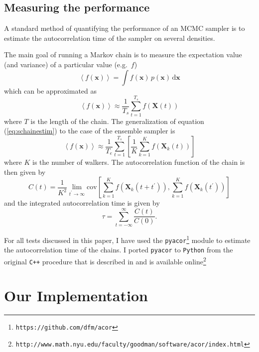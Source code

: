 \documentclass[12pt,preprint]{aastex}
\newcommand{\project}[1]{\texttt{#1}}
\newcommand{\eq}[1]{equation (\ref{eq:#1})}
\newcommand{\eqlabel}[1]{\label{eq:#1}}
\newcommand{\dd}{\mathrm{d}}
\begin{document}
\subsection{Measuring the performance}

A standard method of quantifying the performance of an MCMC sampler is to estimate
the autocorrelation time of the sampler on several densities.

The main goal of running a Markov chain is to measure the expectation value (and
variance) of a particular value (e.g.~$f$)
\begin{equation}
    \left < f(\mathbf{x}) \right > = \int f(\mathbf{x}) \, p (\mathbf{x}) \, \dd \mathbf{x}
\end{equation}
which can be approximated as
\begin{equation}
    \eqlabel{schainestim}
    \left < f(\mathbf{x}) \right > \approx \frac{1}{T_s} \sum_{t=1}^{T_s} f(\mathbf{X}(t))
\end{equation}
where $T$ is the length of the chain.  The generalization of \eq{schainestim} to
the case of the ensemble sampler is
\begin{equation}
    \eqlabel{echainestim}
    \left < f(\mathbf{x}) \right > \approx \frac{1}{T_e} \sum_{t=1}^{T_s} \left [ \frac{1}{K} \sum_{k = 1}^{K} f(\mathbf{X}_k(t)) \right ]
\end{equation}
where $K$ is the number of walkers.  The autocorrelation function of the chain is
then given by
\begin{equation}
    C (t) = \frac{1}{K^2} \lim_{t^\prime \to \infty} \mathrm{cov} \left [ \sum_{k = 1}^{K} f(\mathbf{X}_k (t+t^\prime)),
         \sum_{k = 1}^{K} f(\mathbf{X}_k (t^\prime)) \right ]
\end{equation}
and the integrated autocorrelation time is given by
\begin{equation}
    \tau = \sum_{t= -\infty} ^{\infty} \frac{C(t)}{C(0)} .
\end{equation}

For all tests discussed in this paper, I have used the \project{pyacor}\footnote{\texttt{https://github.com/dfm/acor}}
module to estimate the autocorrelation time of the chains. I ported \project{pyacor} to \project{Python}
from the original \project{C++} procedure that is described in \citet{Goodman:2010} and
is available online\footnote{\texttt{http://www.math.nyu.edu/faculty/goodman/software/acor/index.html}}

\section{Our Implementation}
\end{document}
